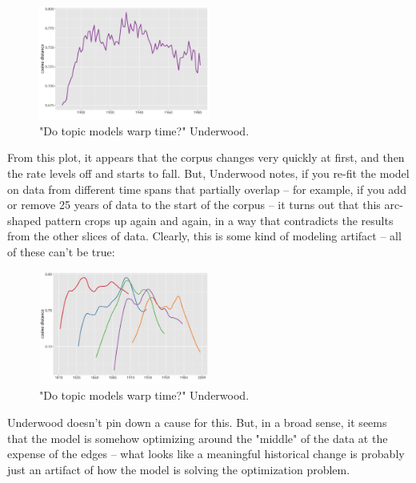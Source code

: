\documentclass{scrartcl}
\begin{document}
\begin{figure}[H]
  \centering
  \includegraphics[width=0.5\textwidth]{figures/tm-banding-1.jpg}
  \caption{"Do topic models warp time?" Underwood.}
\end{figure}

From this plot, it appears that the corpus changes very quickly at first, and then the rate levels off and starts to fall. But, Underwood notes, if you re-fit the model on data from different time spans that partially overlap -- for example, if you add or remove 25 years of data to the start of the corpus -- it turns out that this arc-shaped pattern crops up again and again, in a way that contradicts the results from the other slices of data. Clearly, this is some kind of modeling artifact -- all of these can't be true:

\begin{figure}[H]
  \centering
  \includegraphics[width=0.5\textwidth]{figures/tm-banding-2.jpg}
  \caption{"Do topic models warp time?" Underwood.}
\end{figure}

Underwood doesn't pin down a cause for this. But, in a broad sense, it seems that the model is somehow optimizing around the "middle" of the data at the expense of the edges -- what looks like a meaningful historical change is probably just an artifact of how the model is solving the optimization problem.
\end{document}
